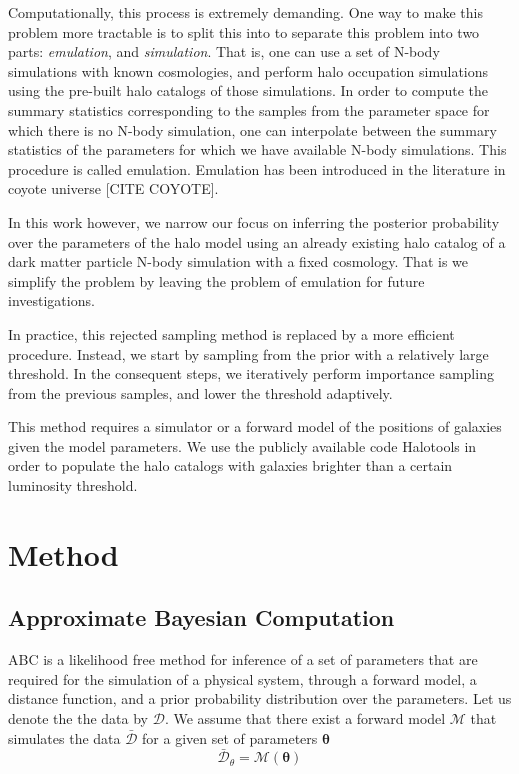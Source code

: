 \documentclass[12pt, preprint]{aastex}
\newcommand{\beq}{\begin{equation}}
\newcommand{\eeq}{\end{equation}}
\begin{document}
Computationally, this process is extremely demanding. One way to make this problem more tractable is to split this into to separate this problem into two parts: \emph{emulation}, and \emph{simulation}. That is, one can use a set of N-body simulations with known cosmologies, and perform halo occupation simulations using the pre-built halo catalogs of those simulations. In order to compute the summary statistics corresponding to the samples from the parameter space for which there is no N-body simulation, one can interpolate between the summary statistics of the parameters for which we have available N-body simulations. This procedure is called emulation. Emulation has been introduced in the literature in coyote universe [CITE COYOTE].

In this work however, we narrow our focus on inferring the posterior probability over the parameters of the halo model using an already existing halo catalog of a dark matter particle N-body simulation with a fixed cosmology. That is we simplify the problem by leaving the problem of emulation for future investigations.

In practice, this rejected sampling method is replaced by a more efficient procedure. Instead, we start by sampling from the prior with a relatively large threshold. In the consequent steps, we iteratively perform importance sampling from the previous samples, and lower the threshold adaptively. 

This method requires a simulator or a forward model of the positions of galaxies given the model parameters. We use the publicly available code Halotools in order to populate the halo catalogs with galaxies brighter than a certain luminosity threshold.

\section{Method}

\subsection{Approximate Bayesian Computation}

ABC is a likelihood free method for inference of a set of parameters that are required for the simulation of a 
physical system, through a forward model, a distance function, and a prior probability distribution over the parameters. 
Let us denote the the data by $\mathcal{D}$. We assume that there exist a forward model $\mathcal{M}$ that 
simulates the data $\bar{\mathcal{D}}$ for a given set of parameters $\bm{\theta}$
\beq
\bar{\mathcal{D}}_{\theta} = \mathcal{M}(\bm{\theta})
\eeq
\end{document}
